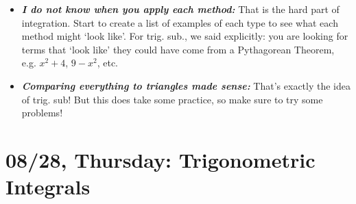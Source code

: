 \documentclass[11pt,letterpaper]{article}
\begin{document}
\begin{itemize}
\item {\bfseries\itshape I do not know when you apply each method:} That is the hard part of integration. Start to create a list of examples of each type to see what each method might `look like'. For trig. sub., we said explicitly: you are looking for terms that `look like' they could have come from a Pythagorean Theorem, e.g. $x^2 + 4$, $9 - x^2$, etc. 

\item {\bfseries\itshape Comparing everything to triangles made sense:} That's exactly the idea of trig. sub! But this does take some practice, so make sure to try some problems!
\end{itemize}

\newpage
\section*{08/28, Thursday: Trigonometric Integrals\label{08-28}}
\end{document}
